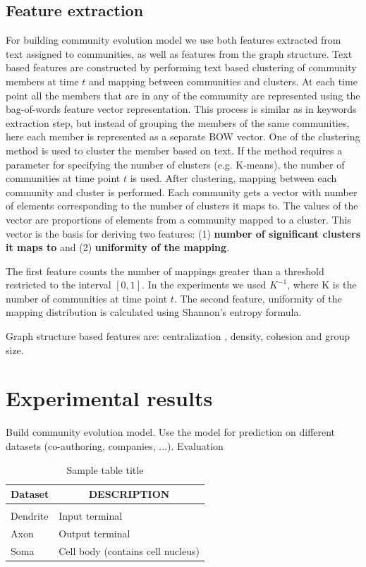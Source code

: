 \documentclass{article} %
\begin{document}
\subsection{Feature extraction}
For building community evolution model we use both features extracted from text assigned to communities, as well as features from the graph structure. Text based features are constructed by performing text based clustering of community members at time $t$ and mapping between communities and clusters. At each time point all the members that are in any of the community are represented using the bag-of-words feature vector representation. This process is similar as in keywords extraction step, but instead of grouping the members of the same communities, here each member is represented as a separate BOW vector. One of the clustering method is used to cluster the member based on text. If the method requires a parameter for specifying the number of clusters (e.g. K-means), the number of communities at time point $t$ is used. After clustering, mapping between each community and cluster is performed. Each community gets a vector with number of elements corresponding to the number of clusters it maps to. The values of the vector are proportions of elements from a community mapped to a cluster. This vector is the basis for deriving two features: (1) {\bf number of significant clusters it maps to} and (2) { \bf uniformity of the mapping}.

The first feature counts the number of mappings greater than a threshold restricted to the interval $[0, 1]$. In the experiments we used $K^{-1}$, where K is  the number of communities at time point $t$. The second feature, uniformity of the mapping distribution is calculated using Shannon's entropy formula.

Graph structure based features are: centralization \cite{freeman1978}, density\cite{wasserman1994}, cohesion and group size.

\section{Experimental results}
Build community evolution model.
Use the model for prediction on different datasets (co-authoring, companies, ...). Evaluation

\begin{table}[t]
\caption{Sample table title}
\label{sample-table}
\begin{center}
\begin{tabular}{ll}
\multicolumn{1}{c}{\bf Dataset}  &\multicolumn{1}{c}{\bf DESCRIPTION}
\\ \hline \\
Dendrite         &Input terminal \\
Axon             &Output terminal \\
Soma             &Cell body (contains cell nucleus) \\
\end{tabular}
\end{center}
\end{table}
\end{document}
